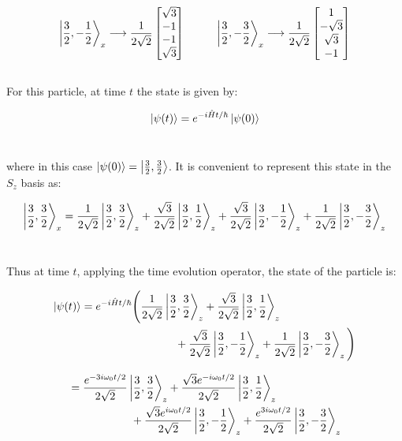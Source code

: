 \documentclass[9pt]{extarticle}
\begin{document}
\begin{multicols*}{2}
$$
\ket{\frac 32 , -\frac 12}_x \longrightarrow \frac{1}{2\sqrt 2}
\begin{bmatrix}
        \sqrt 3 \\
        -1 \\
        -1 \\
        \sqrt 3
\end{bmatrix}
\hspace{1cm}
\ket{\frac 32 , -\frac 32}_x \longrightarrow \frac{1}{2\sqrt 2}
\begin{bmatrix}
        1 \\
        -\sqrt 3 \\
        \sqrt 3 \\
        -1
\end{bmatrix}
$$ \\ 

For this particle, at time $t$ the state is given by:

$$\ket{\psi(t)} = e^{-i\hat H t / \hbar} \ket{\psi(0)}$$ \

where in this case $\ket{\psi(0)} = \ket{\frac 32, \frac 32}$. It is convenient to represent this state in the $S_z$ basis as:

$$
\ket{\frac 32 , \frac 32}_x = \frac{1}{2\sqrt 2} \ket{\frac 32, \frac 32}_z + \frac{\sqrt 3}{2\sqrt 2} \ket{\frac 32 , \frac 12}_z + \frac{\sqrt 3}{2\sqrt 2} \ket{\frac 32 , -\frac 12}_z + \frac{1}{2\sqrt 2} \ket{\frac 32 , -\frac 32}_z 
$$ \ 

Thus at time $t$, applying the time evolution operator, the state of the particle is:

$$
\begin{aligned}
	\ket{\psi(t)} &= e^{-i\hat H t / \hbar} \Bigg( \frac{1}{2\sqrt 2} \ket{\frac 32, \frac 32}_z + \frac{\sqrt 3}{2\sqrt 2} \ket{\frac 32 , \frac 12}_z \\ 
	&\hspace{3cm} + \frac{\sqrt 3}{2\sqrt 2} \ket{\frac 32 , -\frac 12}_z + \frac{1}{2\sqrt 2} \ket{\frac 32 , -\frac 32}_z \Bigg)
\end{aligned}
$$

$$
\begin{aligned}
	&= \frac{e^{-3i \omega_0 t / 2}}{2\sqrt 2} \ket{\frac 32, \frac 32}_z + \frac{\sqrt 3 e^{-i \omega_0 t / 2}}{2\sqrt 2} \ket{\frac 32 , \frac 12}_z \\ 
	&\hspace{2cm} + \frac{\sqrt 3 e^{i \omega_0 t / 2}}{2\sqrt 2} \ket{\frac 32 , -\frac 12}_z + \frac{e^{3i \omega_0 t / 2}}{2\sqrt 2} \ket{\frac 32, -\frac 32}_z
\end{aligned}
$$ \ 


\end{multicols*}
\end{document}
